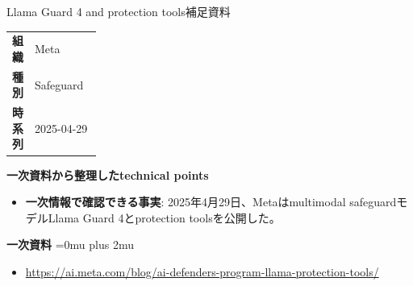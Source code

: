 \begin{technicalnote}{Llama Guard 4 and protection tools}{補足資料}
\begingroup
\begin{tabularx}{\linewidth}{@{}>{\bfseries}p{0.22\linewidth}X@{}}
組織 & Meta \\
種別 & Safeguard \\
時系列 & 2025-04-29 \\
\end{tabularx}
\smallskip
\begin{minipage}{\linewidth}
{\bfseries 一次資料から整理したtechnical points}
\begin{itemize}[leftmargin=1.5em,itemsep=0.35em]
\item \textbf{一次情報で確認できる事実}: 2025年4月29日、Metaはmultimodal safeguardモデルLlama Guard 4とprotection toolsを公開した。
\end{itemize}
\begin{samepage}
{\bfseries 一次資料}
\begingroup\sloppy
\Urlmuskip=0mu plus 2mu\relax
\begin{itemize}[leftmargin=1.5em,itemsep=0.25em]
\item {\scriptsize\url{https://ai.meta.com/blog/ai-defenders-program-llama-protection-tools/}}
\end{itemize}
\endgroup
\end{samepage}
\end{minipage}
\endgroup
\end{technicalnote}
\medskip

